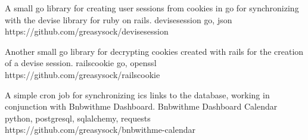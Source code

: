 \documentclass[]{awesome-cv}
\begin{document}
\vspace{3mm}
\begin{cventries}
	\cventry
	{A small go library for creating user sessions from cookies in go for synchronizing with the devise library for ruby on rails.}
	{devisesession}
	{go, json}
	{https://github.com/greasysock/devisesession}
	{}
	
	\vspace{-5mm}
	\cventry
	{Another small go library for decrypting cookies created with rails for the creation of a devise session.}
	{railscookie}
	{go, openssl}
	{https://github.com/greasysock/railscookie}
	{}

	\vspace{-5mm}
	\cventry
	{A simple cron job for synchronizing ics links to the database, working in conjunction with Bnbwithme Dashboard.}
	{Bnbwithme Dashboard Calendar}
	{python, postgresql, sqlalchemy, requests}
	{https://github.com/greasysock/bnbwithme-calendar}
	{}
\end{cventries}

\ 
\end{document}
